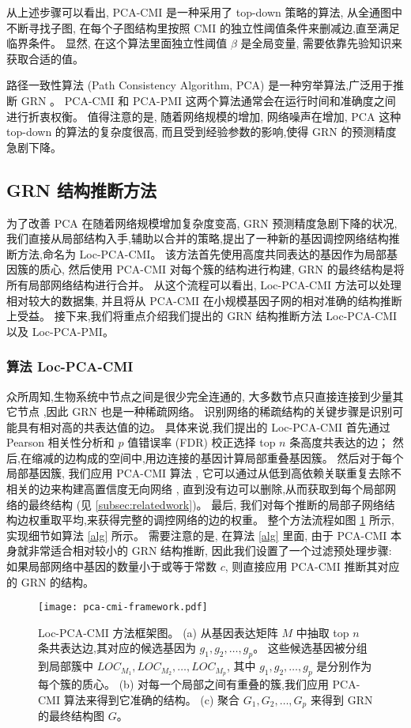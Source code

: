 从上述步骤可以看出, PCA-CMI 是一种采用了 top-down 策略的算法, 
从全通图中不断寻找子图, 在每个子图结构里按照 CMI 的独立性阈值条件来删减边,直至满足临界条件。
显然, 在这个算法里面独立性阈值 $\beta$ 是全局变量, 需要依靠先验知识来获取合适的值。

路径一致性算法 (Path Consistency Algorithm, PCA) 是一种穷举算法,广泛用于推断 GRN 。
PCA-CMI 和 PCA-PMI 这两个算法通常会在运行时间和准确度之间进行折衷权衡。
值得注意的是, 
随着网络规模的增加, 网络噪声在增加,
PCA 这种 top-down 的算法的复杂度很高, 而且受到经验参数的影响,使得 GRN 的预测精度急剧下降。

\subsection{GRN 结构推断方法}
为了改善 PCA 在随着网络规模增加复杂度变高, GRN 预测精度急剧下降的状况,我们直接从局部结构入手,辅助以合并的策略,提出了一种新的基因调控网络结构推断方法,命名为 Loc-PCA-CMI。
该方法首先使用高度共同表达的基因作为局部基因簇的质心,
然后使用 PCA-CMI 对每个簇的结构进行构建, GRN 的最终结构是将所有局部网络结构进行合并。
从这个流程可以看出, Loc-PCA-CMI 方法可以处理相对较大的数据集,
并且将从 PCA-CMI 在小规模基因子网的相对准确的结构推断上受益。
接下来,我们将重点介绍我们提出的 GRN 结构推断方法 Loc-PCA-CMI 以及 Loc-PCA-PMI。

\subsubsection{算法 Loc-PCA-CMI}

众所周知,生物系统中节点之间是很少完全连通的,
大多数节点只直接连接到少量其它节点 ,因此 GRN 也是一种稀疏网络。
识别网络的稀疏结构的关键步骤是识别可能具有相对高的共表达值的边。
具体来说,我们提出的 Loc-PCA-CMI 首先通过 Pearson 相关性分析和 $p$ 值错误率 (FDR) 校正选择 top $n$ 条高度共表达的边；
然后,在缩减的边构成的空间中,用边连接的基因计算局部重叠基因簇。
然后对于每个局部基因簇, 我们应用 PCA-CMI 算法 ,
它可以通过从低到高依赖关联重复去除不相关的边来构建高置信度无向网络 ,
直到没有边可以删除,从而获取到每个局部网络的最终结构 (见 \ref{subsec:relatedwork})。
最后, 我们对每个推断的局部子网络结构边权重取平均,来获得完整的调控网络的边的权重。
整个方法流程如图 \ref{pca-cmi-fr} 所示,实现细节如算法 \ref{alg} 所示。
需要注意的是,
在算法 \ref{alg} 里面,
由于 PCA-CMI 本身就非常适合相对较小的 GRN 结构推断,
因此我们设置了一个过滤预处理步骤: 如果局部网络中基因的数量小于或等于常数 $c$,
则直接应用 PCA-CMI 推断其对应的 GRN 的结构。
\begin{figure}[!htbp]
    \centering
    \texttt{[image: pca-cmi-framework.pdf]}
    \caption{Loc-PCA-CMI 方法框架图。
    (a) 从基因表达矩阵 $M$ 中抽取 top $n$ 条共表达边,其对应的候选基因为 $g_1,g_2,\ldots,g_{p} $。
    这些候选基因被分组到局部簇中 $LOC_{M_1}, LOC_{M_2},\ldots,LOC_{M_{p}}$,
    其中 $g_1,g_2,\ldots,g_{p}$ 是分别作为每个簇的质心。
    (b) 对每一个局部之间有重叠的簇,我们应用 PCA-CMI 算法来得到它准确的结构。
    (c) 聚合 $G_1, G_2, \ldots, G_p$ 来得到 GRN 的最终结构图 $G$。
    }
    \label{pca-cmi-fr}
\end{figure}

